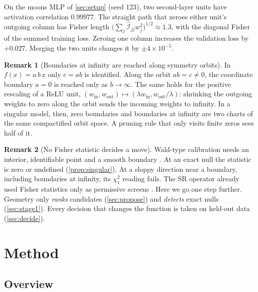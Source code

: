 \documentclass[11pt,a4paper]{article}
\theoremstyle{definition}
\newtheorem{remark}{Remark}
\newcommand{\Fis}{\mathcal{I}}
\newcommand{\Fhat}{\widehat{\Fis}}
\begin{document}
On the moons MLP of \cref{sec:setup} (seed 123), two second-layer units have activation
correlation $0.99977$. The straight path that zeroes either unit's outgoing column has
Fisher length $\big(\sum_j\Fhat_{jj}w_j^2\big)^{1/2}\approx1.3$, with the diagonal Fisher
of the summed training loss. Zeroing one column increases the validation loss by
$+0.027$. Merging the two units changes it by $\pm4\times10^{-5}$.

\begin{remark}[Boundaries at infinity are reached along symmetry orbits]
\label{rem:infinity}
In $f(x)=a\,b\,x$ only $c=ab$ is identified. Along the orbit $ab=c\neq0$, the coordinate
boundary $a=0$ is reached only as $b\to\infty$. The same holds for the positive
rescaling of a ReLU unit, $(w_{\mathrm{in}},w_{\mathrm{out}})\mapsto
(\lambda w_{\mathrm{in}},w_{\mathrm{out}}/\lambda)$: shrinking the outgoing weights to
zero along the orbit sends the incoming weights to infinity. In a singular model, then,
zero boundaries and boundaries at infinity are two charts of the same compactified
orbit space. A pruning rule that only visits finite zeros sees half of it.
\end{remark}

\begin{remark}[No Fisher statistic decides a move]
\label{rem:calibration}
Wald-type calibration needs an interior, identifiable point and a smooth boundary
\citep{wald1943tests,chernoff1954distribution,self1987asymptotic}. At an exact null the
statistic is zero or undefined (\cref{prop:singular}). At a sloppy direction near a
boundary, including boundaries at infinity, its $\chi^{2}_{1}$ reading fails. The SR
operator already used Fisher statistics only as permissive screens
\citep{guidetti2026emergent}. Here we go one step further. Geometry only \emph{ranks}
candidates (\cref{sec:propose}) and \emph{detects} exact nulls (\cref{sec:stage1}).
Every decision that changes the function is taken on held-out data (\cref{sec:decide}).
\end{remark}

\section{Method}
\label{sec:method}

\subsection{Overview}
\label{sec:overview}
\end{document}
